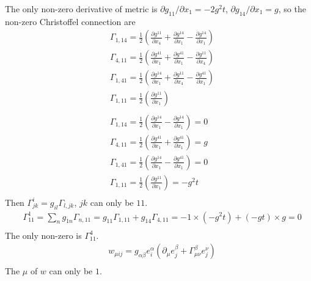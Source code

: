 The only non-zero derivative of metric is $\partial g_{11} / \partial x_1=-2g^2 t$, $\partial g_{14} / \partial x_1 = g$, so the non-zero Christoffel connection are \begin{equation}
\begin{split}
&\Gamma _{1,14}=\frac{1}{2}\left(\frac{\partial g^{11}}{\partial x_4}+\frac{\partial g^{14}}{\partial x_1}-\frac{\partial g^{14}}{\partial x_1}\right)\\
&\Gamma _{4,11}=\frac{1}{2}\left(\frac{\partial g^{41}}{\partial x_1}+\frac{\partial g^{41}}{\partial x_1}-\frac{\partial g^{11}}{\partial x_4}\right)\\
&\Gamma _{1,41}=\frac{1}{2}\left(\frac{\partial g^{14}}{\partial x_1}+\frac{\partial g^{11}}{\partial x_4}-\frac{\partial g^{41}}{\partial x_1}\right)\\
&\Gamma _{1,11}=\frac{1}{2}\left(\frac{\partial g^{11}}{\partial x_1}\right)\\
&\\
&\Gamma _{1,14}=\frac{1}{2}\left(\frac{\partial g^{14}}{\partial x_1}-\frac{\partial g^{14}}{\partial x_1}\right)=0\\
&\Gamma _{4,11}=\frac{1}{2}\left(\frac{\partial g^{41}}{\partial x_1}+\frac{\partial g^{41}}{\partial x_1}\right)=g\\
&\Gamma _{1,41}=\frac{1}{2}\left(\frac{\partial g^{14}}{\partial x_1}-\frac{\partial g^{41}}{\partial x_1}\right)=0\\
&\Gamma _{1,11}=\frac{1}{2}\left(\frac{\partial g^{11}}{\partial x_1}\right)=-g^2t\\
\end{split}
\end{equation}
Then $\Gamma ^i_{jk}=g_{i l}\Gamma _{l,jk}$, $jk$ can only be $11$.
\begin{equation}
\begin{split}
&\Gamma ^1_{11}=\sum _n g_{1 n}\Gamma _{n,11}=g_{11}\Gamma _{1,11}+g_{14}\Gamma _{4,11}=-1\times (-g^2t) + (-g t)\times g =0\\
\end{split}
\end{equation}
The only non-zero is $\Gamma ^4_{11}$.
\begin{equation}
\begin{split}
&w_{\mu ij}=g_{\alpha \beta}e_i^{\alpha}(\partial _{\mu}e_j^{\beta}+\Gamma ^{\beta}_{\mu\nu}e_j^{\nu})\\
\end{split}
\end{equation}
The $\mu$ of $w$ can only be $1$.
